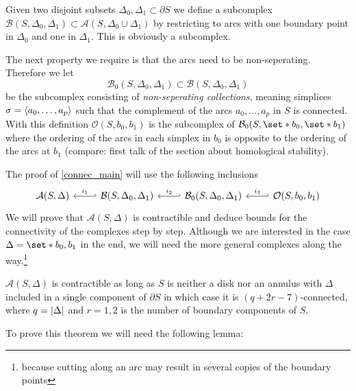 Given two disjoint subsets $\Delta_0, \Delta_1 \subset \partial S$ we define a subcomplex $\mathcal{B}(S,\Delta_0,\Delta_1) \subset \mathcal{A}(S,\Delta_0 \cup \Delta_1)$ by restricting to arcs with one boundary point in $\Delta_0$ and one in $\Delta_1$.
This is obviously a subcomplex.

The next property we require is that the arcs need to be non-seperating.
Therefore we let 
\[
	\mathcal{B}_0(S,\Delta_0, \Delta_1) \subset \mathcal{B}(S,\Delta_0, \Delta_1) 
\]
be the subcomplex consisting of \emph{non-seperating collections}, meaning simplices $\sigma = \angbrace{a_0, \ldots ,a_p}$ such that the complement of the arcs $a_0, \ldots ,a_p$ in $S$ is connected.
With this definition $\mathcal{O}(S,b_0,b_1)$ is the subcomplex of $\mathcal{B}_0(S,\set*{b_0},\set*{b_1})$ where the ordering of the arcs in each simplex in $b_0$ is opposite to the ordering of the arcs at $b_1$ (compare: first talk of the section about homological stability).

The proof of \autoref{connec_main} will use the following inclusions
\[
	\begin{tikzcd}
		\mathcal{A}(S,\Delta) & \mathcal{B}(S, \Delta_0, \Delta_1) \lar["i_1"',hook'] & \mathcal{B}_0(S,\Delta_0,\Delta_1) \lar["i_2"',hook'] & \mathcal{O}(S,b_0,b_1) \lar["i_3"',hook']
	\end{tikzcd}
\]
We will prove that $\mathcal{A}(S,\Delta)$ is contractible and deduce bounds for the connectivity of the complexes step by step.
Although we are interested in the case $\Delta=\set*{b_0,b_1}$ in the end, we will need the more general complexes along the way.\footnote{because cutting along an arc may result in several copies of the boundary points}

\begin{theorem}[label=thm:connec_full]
	$\mathcal{A}(S,\Delta)$ is contractible as long as $S$ is neither a disk nor an annulus with $\Delta$ included in a single component of $\partial S$ in which case it is $(q+2r-7)$-connected, where $q=\abs*{\Delta}$ and $r=1,2$ is the number of boundary components of $S$.
\end{theorem}

To prove this theorem we will need the following lemma:


